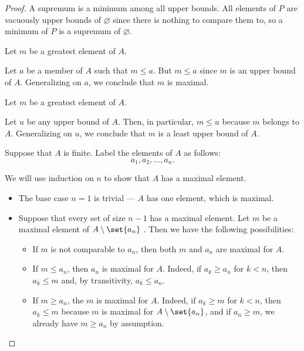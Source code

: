\begin{proof}
   A supremum is a minimum among all upper bounds. All elements of \( P \) are vacuously upper bounds of \( \varnothing \) since there is nothing to compare them to, so a minimum of \( P \) is a supremum of \( \varnothing \).

   Let \( m \) be a greatest element of \( A \).

  Let \( a \) be a member of \( A \) such that \( m \leq a \). But \( m \leq a \) since \( m \) is an upper bound of \( A \). Generalizing on \( a \), we conclude that \( m \) is maximal.

   Let \( m \) be a greatest element of \( A \).

  Let \( u \) be any upper bound of \( A \). Then, in particular, \( m \leq u \) because \( m \) belongs to \( A \). Generalizing on \( u \), we conclude that \( m \) is a least upper bound of \( A \).

   Suppose that \( A \) is finite. Label the elements of \( A \) as follows:
  \begin{equation*}
    a_1, a_2, \ldots, a_n.
  \end{equation*}

  We will use induction on \( n \) to show that \( A \) has a maximal element.
  \begin{itemize}
    \item The base case \( n = 1 \) is trivial --- \( A \) has one element, which is maximal.
    \item Suppose that every set of size \( n - 1 \) has a maximal element. Let \( m \) be a maximal element of \( A \setminus \set{ a_n } \) . Then we have the following possibilities:
    \begin{itemize}
      \item If \( m \) is not comparable to \( a_n \), then both \( m \) and \( a_n \) are maximal for \( A \).

      \item If \( m \leq a_n \), then \( a_n \) is maximal for \( A \). Indeed, if \( a_k \geq a_n \) for \( k < n \), then \( a_k \leq m \) and, by transitivity, \( a_k \leq a_n \).

      \item If \( m \geq a_n \), the \( m \) is maximal for \( A \). Indeed, if \( a_k \geq m \) for \( k < n \), then \( a_k \leq m \) because \( m \) is maximal for \( A \setminus \set{ a_n } \), and if \( a_n \geq m \), we already have \( m \geq a_n \) by assumption.
    \end{itemize}


\end{itemize}
\end{proof}
